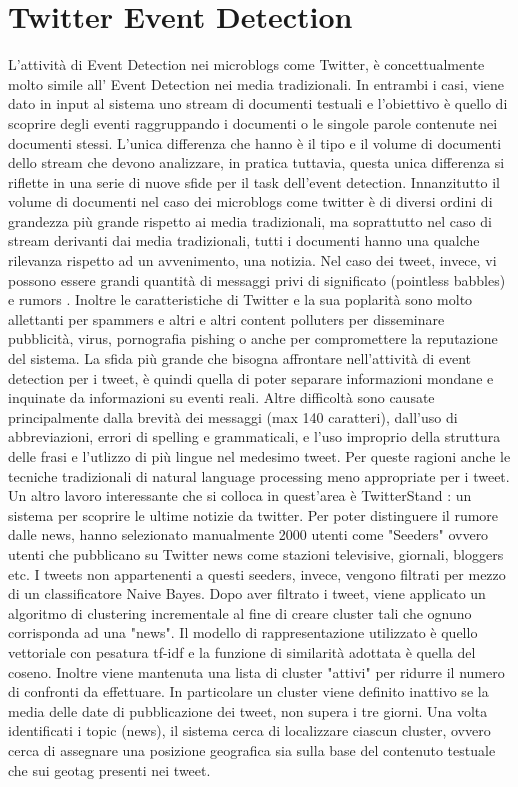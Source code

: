 \documentclass[a4paper,12pt]{report}
\begin{document}
\section{Twitter Event Detection }
L'attività di Event Detection nei microblogs come Twitter, è concettualmente molto simile all' Event Detection nei media tradizionali. In entrambi i casi, viene dato in input al sistema  uno stream di documenti testuali e l'obiettivo è quello di scoprire degli eventi raggruppando i documenti o le singole parole contenute nei documenti stessi. L'unica differenza che hanno è il tipo e il volume di documenti dello stream che devono analizzare, in pratica tuttavia, questa unica differenza si riflette in una serie di nuove sfide per il task dell'event detection. 
Innanzitutto il volume di documenti nel caso dei microblogs come twitter  è di diversi ordini di grandezza più grande rispetto ai media tradizionali, ma soprattutto nel caso di stream derivanti dai media tradizionali, tutti i documenti hanno una qualche rilevanza rispetto ad un avvenimento, una notizia. Nel caso dei tweet, invece, vi possono essere grandi quantità di messaggi privi di significato (pointless babbles) \cite{DBLP:conf/icwsm/HurlockW11} e rumors \cite{Castillo:2011:ICT:1963405.1963500}. Inoltre le caratteristiche di Twitter e la sua poplarità sono molto allettanti per spammers e altri e altri content polluters \cite{DBLP:conf/icwsm/LeeEC11} per disseminare pubblicità, virus, pornografia pishing o anche per compromettere la reputazione del sistema. La sfida più grande che bisogna affrontare nell'attività di event detection per i tweet, è quindi quella di poter separare informazioni mondane e inquinate da informazioni su eventi reali. Altre difficoltà sono causate principalmente dalla brevità dei messaggi (max 140 caratteri), dall'uso di abbreviazioni, errori di spelling e grammaticali, e l'uso improprio della struttura delle frasi e l'utlizzo di più lingue nel medesimo tweet. Per queste ragioni anche le tecniche tradizionali di natural language processing  meno appropriate per i tweet. Un altro lavoro interessante che si colloca in quest'area è TwitterStand \cite{Sankaranarayanan:2009:TNT:1653771.1653781}: un sistema per scoprire le ultime  notizie da twitter. Per poter distinguere il rumore dalle news, hanno selezionato manualmente 2000 utenti come "Seeders" ovvero utenti che pubblicano su Twitter news come stazioni televisive, giornali, bloggers etc. I tweets non appartenenti a questi seeders, invece, vengono filtrati per mezzo di un classificatore Naive Bayes. Dopo aver filtrato i tweet, viene applicato un algoritmo di clustering incrementale al fine di creare cluster tali che ognuno corrisponda ad una "news". Il modello di rappresentazione utilizzato è quello vettoriale con pesatura tf-idf e la funzione di similarità adottata è quella del coseno.  Inoltre viene mantenuta una lista di cluster "attivi" per ridurre il numero di confronti da effettuare. In particolare un cluster viene definito inattivo se la media delle date di pubblicazione dei tweet, non supera i tre giorni. Una volta identificati i topic (news), il sistema cerca di localizzare ciascun cluster, ovvero cerca di assegnare una posizione geografica sia sulla base del contenuto testuale che sui geotag presenti nei tweet.
\end{document}
